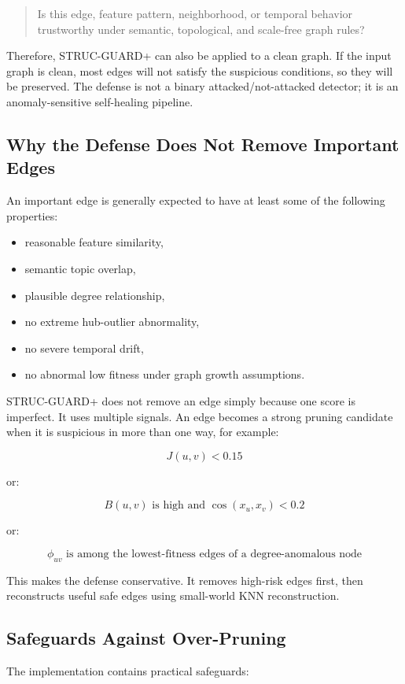 \documentclass[12pt,a4paper]{article}
\begin{document}
\begin{quote}
Is this edge, feature pattern, neighborhood, or temporal behavior trustworthy under semantic, topological, and scale-free graph rules?
\end{quote}

Therefore, STRUC-GUARD+ can also be applied to a clean graph. If the input graph is clean, most edges will not satisfy the suspicious conditions, so they will be preserved. The defense is not a binary attacked/not-attacked detector; it is an anomaly-sensitive self-healing pipeline.

\subsection{Why the Defense Does Not Remove Important Edges}
An important edge is generally expected to have at least some of the following properties:

\begin{itemize}
    \item reasonable feature similarity,
    \item semantic topic overlap,
    \item plausible degree relationship,
    \item no extreme hub-outlier abnormality,
    \item no severe temporal drift,
    \item no abnormal low fitness under graph growth assumptions.
\end{itemize}

STRUC-GUARD+ does not remove an edge simply because one score is imperfect. It uses multiple signals. An edge becomes a strong pruning candidate when it is suspicious in more than one way, for example:

$$
J(u,v)<0.15
$$

or:

$$
B(u,v)\text{ is high and }\cos(x_u,x_v)<0.2
$$

or:

$$
\phi_{uv}\text{ is among the lowest-fitness edges of a degree-anomalous node}
$$

This makes the defense conservative. It removes high-risk edges first, then reconstructs useful safe edges using small-world KNN reconstruction.

\subsection{Safeguards Against Over-Pruning}
The implementation contains practical safeguards:
\end{document}
